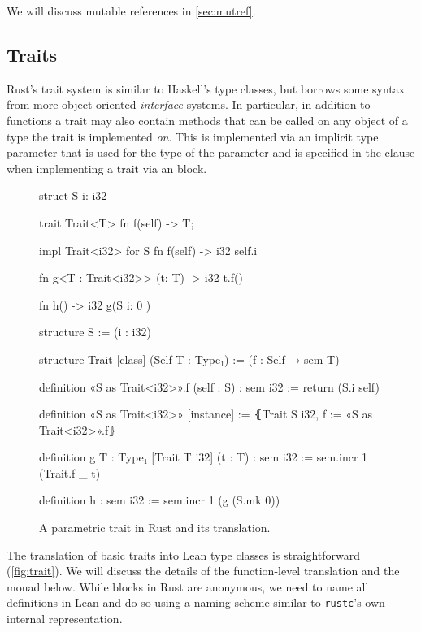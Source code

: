 We will discuss mutable references in \autoref{sec:mutref}.

\subsection{Traits}

Rust's trait system is similar to Haskell's type classes, but borrows some
syntax from more object-oriented \emph{interface} systems. In particular, in addition
to functions a trait may also contain methods that can be called on any object
of a type the trait is implemented \emph{on}. This is implemented via an implicit
type parameter  that is used for the type of the 
parameter and is specified in the  clause when implementing a trait via an  block.

\begin{figure}[bt]
\begin{sbs1}
struct S { i: i32 }

trait Trait<T> {
  fn f(self) -> T;
}

impl Trait<i32> for S {
  fn f(self) -> i32 {
    self.i
  }
}

fn g<T : Trait<i32>>
  (t: T) -> i32 {
  t.f()
}

fn h() -> i32 {
  g(S { i: 0 })
}
\end{sbs1}
\begin{sbs2}
structure S := (i : i32)

structure Trait [class] (Self T : Type₁) :=
(f : Self → sem T)

definition «S as Trait<i32>».f (self : S) : sem i32 :=
return (S.i self)

definition «S as Trait<i32>» [instance] :=
⦃Trait S i32, f := «S as Trait<i32>».f⦄

definition g {T : Type₁} [Trait T i32] (t : T) : sem i32 :=
sem.incr 1 (Trait.f _ t)

definition h : sem i32 :=
sem.incr 1 (g (S.mk 0))
\end{sbs2}

\caption{A parametric trait in Rust and its translation.}
\label{fig:trait}
\end{figure}

The translation of basic traits into Lean type classes is straightforward
(\autoref{fig:trait}). We will discuss the details of the function-level translation and the 
monad below. While  blocks in Rust are anonymous, we need to name all
definitions in Lean and do so using a naming scheme similar to \texttt{rustc}'s
own internal representation.

